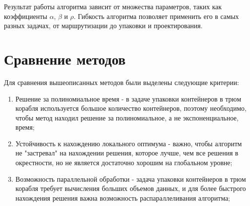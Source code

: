 Результат работы алгоритма зависит от множества параметров, таких как коэффициенты \(\alpha\), \(\beta\) и \(\rho\). Гибкость алгоритма позволяет применить его в самых разных задачах, от маршрутизации до упаковки и проектирования.




\section{Сравнение методов}

Для сравнения вышеописанных методов были выделены следующие критерии:
\begin{enumerate}
	\item Решение за полиномиальное время - в задаче упаковки контейнеров в трюм корабля используется большое количество контейнеров, поэтому необходимо, чтобы метод находил решение за полиномиальное, а не экспоненциальное, время;
	\item Устойчивость к нахождению локального оптимума - важно, чтобы алгоритм не "застревал" на нахождении решения, которое лучше, чем все решения в окрестности, но не является достаточно хорошим на глобальном уровне;
	\item Возможность параллельной обработки - задача упаковки контейнеров в трюм корабля требует вычисления больших объемов данных, и для более быстрого нахождения решения важна возможность распараллеливания алгоритма;
\end{enumerate}


